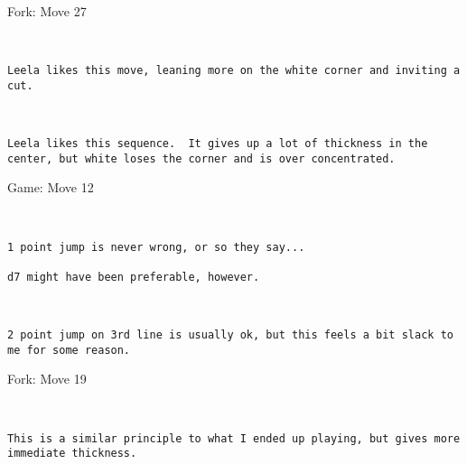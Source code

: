 \documentclass{article}
\begin{document}
\begin{subsection}{Fork: Move 27}
\begin{center}
\cleargoban
{}
\showfullgoban
\\\begin{lstlisting}
Leela likes this move, leaning more on the white corner and inviting a cut. 
\end{lstlisting}
\end{center}
\begin{center}
\cleargoban
{}
\showfullgoban
\\\begin{lstlisting}
Leela likes this sequence.  It gives up a lot of thickness in the center, but white loses the corner and is over concentrated. 
\end{lstlisting}
\end{center}
\end{subsection}
\newpage
\begin{section}{Game: Move 12}
\begin{center}
\cleargoban
{}
\showfullgoban
\\\begin{lstlisting}
1 point jump is never wrong, or so they say...

d7 might have been preferable, however. 
\end{lstlisting}
\end{center}
\begin{center}
\cleargoban
{}
\showfullgoban
\\\begin{lstlisting}
2 point jump on 3rd line is usually ok, but this feels a bit slack to me for some reason.
\end{lstlisting}
\end{center}
\end{section}
\begin{subsection}{Fork: Move 19}
\begin{center}
\cleargoban
{}
\showfullgoban
\\\begin{lstlisting}
This is a similar principle to what I ended up playing, but gives more immediate thickness. 
\end{lstlisting}
\end{center}
\end{subsection}
\end{document}
